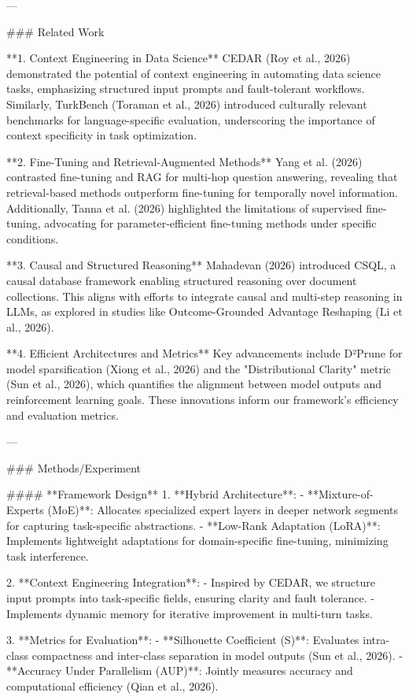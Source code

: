 ---

### Related Work  

**1. Context Engineering in Data Science**  
CEDAR (Roy et al., 2026) demonstrated the potential of context engineering in automating data science tasks, emphasizing structured input prompts and fault-tolerant workflows. Similarly, TurkBench (Toraman et al., 2026) introduced culturally relevant benchmarks for language-specific evaluation, underscoring the importance of context specificity in task optimization.  

**2. Fine-Tuning and Retrieval-Augmented Methods**  
Yang et al. (2026) contrasted fine-tuning and RAG for multi-hop question answering, revealing that retrieval-based methods outperform fine-tuning for temporally novel information. Additionally, Tanna et al. (2026) highlighted the limitations of supervised fine-tuning, advocating for parameter-efficient fine-tuning methods under specific conditions.  

**3. Causal and Structured Reasoning**  
Mahadevan (2026) introduced CSQL, a causal database framework enabling structured reasoning over document collections. This aligns with efforts to integrate causal and multi-step reasoning in LLMs, as explored in studies like Outcome-Grounded Advantage Reshaping (Li et al., 2026).  

**4. Efficient Architectures and Metrics**  
Key advancements include D²Prune for model sparsification (Xiong et al., 2026) and the "Distributional Clarity" metric (Sun et al., 2026), which quantifies the alignment between model outputs and reinforcement learning goals. These innovations inform our framework's efficiency and evaluation metrics.  

---

### Methods/Experiment  

#### **Framework Design**  
1. **Hybrid Architecture**:  
   - **Mixture-of-Experts (MoE)**: Allocates specialized expert layers in deeper network segments for capturing task-specific abstractions.  
   - **Low-Rank Adaptation (LoRA)**: Implements lightweight adaptations for domain-specific fine-tuning, minimizing task interference.  

2. **Context Engineering Integration**:  
   - Inspired by CEDAR, we structure input prompts into task-specific fields, ensuring clarity and fault tolerance.  
   - Implements dynamic memory for iterative improvement in multi-turn tasks.  

3. **Metrics for Evaluation**:  
   - **Silhouette Coefficient (S)**: Evaluates intra-class compactness and inter-class separation in model outputs (Sun et al., 2026).  
   - **Accuracy Under Parallelism (AUP)**: Jointly measures accuracy and computational efficiency (Qian et al., 2026).  

